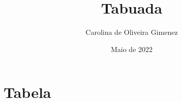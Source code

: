 \documentclass[a4paper]{article}
\title{Tabuada}
\author{Carolina de Oliveira Gimenez}
\date{Maio de 2022}
\begin{document}
    \maketitle

    \section{Tabela}

        
\end{document}
